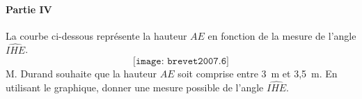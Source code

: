 \paragraph{Partie IV}\hfill\newline
La courbe ci-dessous représente la hauteur $AE$ en fonction de la mesure de l'angle $\widehat{IHE}$.
\[\texttt{[image: brevet2007.6]}\]
M. Durand souhaite que la hauteur $AE$ soit comprise entre 3~m et 3,5~m. En utilisant le graphique, donner une mesure possible de l'angle $\widehat{IHE}$.
